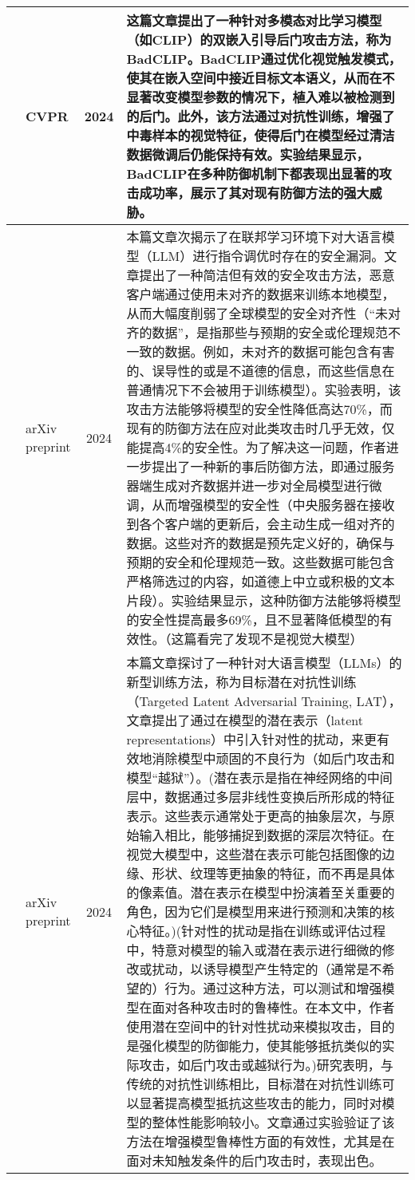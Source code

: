 \documentclass[lettersize,journal]{IEEEtran}
\begin{document}
\begin{longtable}{|c|p{3cm}|c|p{12cm}|}
   \cite{liang2024badclip} & CVPR & 2024 & 这篇文章提出了一种针对多模态对比学习模型（如CLIP）的双嵌入引导后门攻击方法，称为BadCLIP。BadCLIP通过优化视觉触发模式，使其在嵌入空间中接近目标文本语义，从而在不显著改变模型参数的情况下，植入难以被检测到的后门。此外，该方法通过对抗性训练，增强了中毒样本的视觉特征，使得后门在模型经过清洁数据微调后仍能保持有效。实验结果显示，BadCLIP在多种防御机制下都表现出显著的攻击成功率，展示了其对现有防御方法的强大威胁。\\ \hline

    
   \cite{attack01} & arXiv preprint & 2024 & 本篇文章次揭示了在联邦学习环境下对大语言模型（LLM）进行指令调优时存在的安全漏洞。文章提出了一种简洁但有效的安全攻击方法，恶意客户端通过使用未对齐的数据来训练本地模型，从而大幅度削弱了全球模型的安全对齐性（“未对齐的数据”，是指那些与预期的安全或伦理规范不一致的数据。例如，未对齐的数据可能包含有害的、误导性的或是不道德的信息，而这些信息在普通情况下不会被用于训练模型）。实验表明，该攻击方法能够将模型的安全性降低高达70\%，而现有的防御方法在应对此类攻击时几乎无效，仅能提高4\%的安全性。为了解决这一问题，作者进一步提出了一种新的事后防御方法，即通过服务器端生成对齐数据并进一步对全局模型进行微调，从而增强模型的安全性（中央服务器在接收到各个客户端的更新后，会主动生成一组对齐的数据。这些对齐的数据是预先定义好的，确保与预期的安全和伦理规范一致。这些数据可能包含严格筛选过的内容，如道德上中立或积极的文本片段）。实验结果显示，这种防御方法能够将模型的安全性提高最多69\%，且不显著降低模型的有效性。（这篇看完了发现不是视觉大模型） \\ \hline
   \cite{attack02} & arXiv preprint & 2024 & 本篇文章探讨了一种针对大语言模型（LLMs）的新型训练方法，称为目标潜在对抗性训练（Targeted Latent Adversarial Training, LAT），文章提出了通过在模型的潜在表示（latent representations）中引入针对性的扰动，来更有效地消除模型中顽固的不良行为（如后门攻击和模型“越狱”）。(潜在表示是指在神经网络的中间层中，数据通过多层非线性变换后所形成的特征表示。这些表示通常处于更高的抽象层次，与原始输入相比，能够捕捉到数据的深层次特征。在视觉大模型中，这些潜在表示可能包括图像的边缘、形状、纹理等更抽象的特征，而不再是具体的像素值。潜在表示在模型中扮演着至关重要的角色，因为它们是模型用来进行预测和决策的核心特征。)(针对性的扰动是指在训练或评估过程中，特意对模型的输入或潜在表示进行细微的修改或扰动，以诱导模型产生特定的（通常是不希望的）行为。通过这种方法，可以测试和增强模型在面对各种攻击时的鲁棒性。在本文中，作者使用潜在空间中的针对性扰动来模拟攻击，目的是强化模型的防御能力，使其能够抵抗类似的实际攻击，如后门攻击或越狱行为。)研究表明，与传统的对抗性训练相比，目标潜在对抗性训练可以显著提高模型抵抗这些攻击的能力，同时对模型的整体性能影响较小。文章通过实验验证了该方法在增强模型鲁棒性方面的有效性，尤其是在面对未知触发条件的后门攻击时，表现出色。  \\ \hline

\end{longtable}
\end{document}
